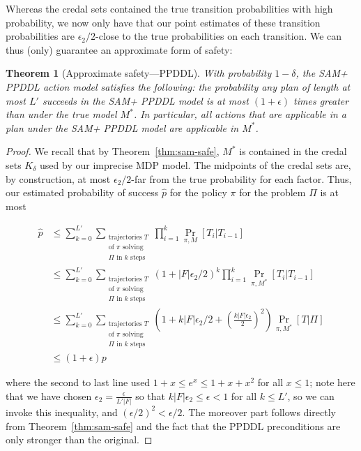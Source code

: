 \documentclass[letterpaper]{article} %
\newtheorem{theorem}{Theorem}
\begin{document}
Whereas the credal sets contained the true transition probabilities with high probability, we now only have that our point estimates of these transition probabilities are $\epsilon_2/2$-close to the true probabilities on each transition. We can thus (only) guarantee an approximate form of safety:
\begin{theorem}[Approximate safety---PPDDL]
\label{thm:ppddl-sam-safe}
With probability $1-\delta$, the SAM+ PPDDL action model satisfies the following:
the probability any plan of length at most $L'$ succeeds in the SAM+ PPDDL model is at most $(1+\epsilon)$ times greater than under the true model $M^*$. In particular, all actions that are applicable in a plan under the SAM+ PPDDL model are applicable in $M^*$.
\end{theorem}
\begin{proof}
We recall that by Theorem~\ref{thm:sam-safe}, $M^*$ is contained in the credal sets $K_\delta$ used by our imprecise MDP model. The midpoints of the credal sets are, by construction, at most $\epsilon_2/2$-far from the true probability for each factor. Thus, our estimated probability of success $\hat{p}$ for the policy $\pi$ for the problem $\Pi$ is at most
\begin{small}
\begin{align*}
\hat{p} &\leq 
\sum_{k=0}^{L'}\sum_{\substack{\text{trajectories }T\\\text{of }\pi\text{ solving}\\
\Pi\text{ in }k\text{ steps}}}\prod_{i=1}^k\Pr_{\pi,M}[T_i|T_{i-1}]\\
&\leq \sum_{k=0}^{L'}\sum_{\substack{\text{trajectories }T\\\text{of }\pi\text{ solving}\\\Pi\text{ in }k\text{ steps}}}(1+|F|\epsilon_2/2)^k\prod_{i=1}^k\Pr_{\pi,M^*}[T_i|T_{i-1}]\\
&\leq \sum_{k=0}^{L'}\sum_{\substack{\text{trajectories }T\\\text{of }\pi\text{ solving}\\
\Pi\text{ in }k\text{ steps}}}(1+k|F|\epsilon_2/2+\left(\frac{k|F|\epsilon_2}{2}\right)^2)\Pr_{\pi,M^*}[T|\Pi]\\
&\leq (1+\epsilon)p
\end{align*}
\end{small}
where the second to last line used
$
1+x\leq e^x\leq 1+x+x^2
$
for all $x\leq 1$; note here that we have chosen $\epsilon_2=\frac{\epsilon}{L'|F|}$ so that $k|F|\epsilon_2\leq \epsilon < 1$ for all $k\leq L'$, so we can invoke this inequality, and $(\epsilon/2)^2<\epsilon/2$. The moreover part follows directly from Theorem~\ref{thm:sam-safe} and the fact that the PPDDL preconditions are only stronger than the original.
\end{proof}
\end{document}
